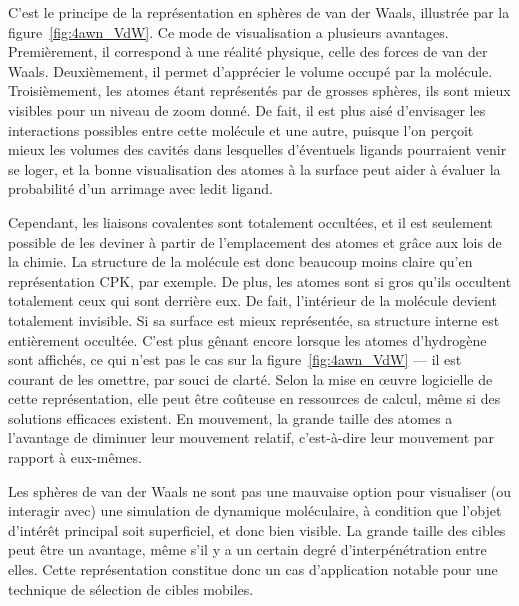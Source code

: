 	C'est le principe de la représentation en sphères de van der Waals, illustrée par la figure~\ref{fig:4awn_VdW}. Ce mode de visualisation a plusieurs avantages. Premièrement, il correspond à une réalité physique, celle des forces de van der Waals. Deuxièmement, il permet d'apprécier le volume occupé par la molécule. Troisièmement, les atomes étant représentés par de grosses sphères, ils sont mieux visibles pour un niveau de zoom donné. De fait, il est plus aisé d'envisager les interactions possibles entre cette molécule et une autre, puisque l'on perçoit mieux les volumes des cavités dans lesquelles d'éventuels ligands\footnotemark{} pourraient venir se loger, et la bonne visualisation des atomes à la surface peut aider à évaluer la probabilité d'un arrimage avec ledit ligand.
	
		
	Cependant, les liaisons covalentes sont totalement occultées, et il est seulement possible de les \og deviner \fg{} à partir de l'emplacement des atomes et grâce aux lois de la chimie. La structure de la molécule est donc beaucoup moins claire qu'en représentation CPK, par exemple. De plus, les atomes sont si gros qu'ils occultent totalement ceux qui sont derrière eux. De fait, l'intérieur de la molécule devient totalement invisible. Si sa surface est mieux représentée, sa structure interne est entièrement occultée. C'est plus gênant encore lorsque les atomes d'hydrogène sont affichés, ce qui n'est pas le cas sur la figure~\ref{fig:4awn_VdW} --- il est courant de les omettre, par souci de clarté. Selon la mise en \oe{}uvre logicielle de cette représentation, elle peut être coûteuse en ressources de calcul, même si des solutions efficaces existent. En mouvement, la grande taille des atomes a l'avantage de diminuer leur mouvement relatif, c'est-à-dire leur mouvement par rapport à eux-mêmes.
		
	Les sphères de van der Waals ne sont pas une mauvaise option pour visualiser (ou interagir avec) une simulation de dynamique moléculaire, à condition que l'objet d'intérêt principal soit superficiel, et donc bien visible. La grande taille des cibles peut être un avantage, même s'il y a un certain degré d'interpénétration entre elles. Cette représentation constitue donc un cas d'application notable pour une technique de sélection de cibles mobiles.
	
